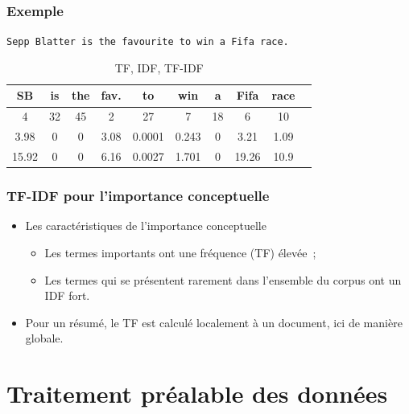 \documentclass[12pt]{beamer}
\begin{document}
\begin{frame}
 \frametitle{Exemple}
 \texttt{Sepp Blatter is the favourite to win a Fifa race.}
 
 \small
 
 \begin{table}
	\begin{tabular}{c|c|c|c|c|c|c|c|c|c}
	 	  SB & is & the & fav. & to & win & a & Fifa & race \\
	 \hline
	 	 4 & 32 & 45 & 2 & 27 & 7 & 18 & 6 & 10\\
	 \hline
	 	 3.98 & 0 & 0 & 3.08 & 0.0001 & 0.243 & 0 & 3.21 & 1.09\\
	 \hline
	       15.92 & 0 & 0 & 6.16 & 0.0027 & 1.701 & 0 & 19.26 & 10.9 \\
	\end{tabular}
	\caption{TF, IDF, TF-IDF}
 \end{table}
\end{frame}

\begin{frame}
 \frametitle{TF-IDF pour l'importance conceptuelle}
 \begin{itemize}
  	\item Les caractéristiques de l'importance conceptuelle
  	\begin{itemize}
  		\item Les termes importants ont une fréquence (TF) élevée~;
 		\item Les termes qui se présentent rarement dans l'ensemble du corpus ont un IDF fort.
  	\end{itemize}
  	\item Pour un résumé, le TF est calculé localement à un document, ici de manière globale.
  \end{itemize}

  
\end{frame}


\section{Traitement préalable des données}

\end{document}
